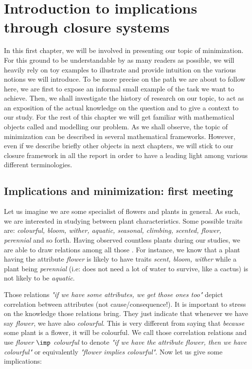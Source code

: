 \chapter{Introduction to implications through closure systems}

In this first chapter, we will be involved in presenting our topic of 
minimization. For this ground to be understandable by as many readers as 
possible, we will heavily rely on toy examples to illustrate and provide 
intuition on the various notions we will introduce. To be more precise on the
path we are about to follow here, we are first to expose an informal
small example of the task we want to achieve. Then, we shall investigate the
history of research on our topic, to act as an exposition of the actual 
knowledge on the question and to give a context to our study. For the rest of
this chapter we will get familiar with mathematical objects called 
 and  modelling our problem.
As we shall observe, the topic of minimization can be described in several 
mathematical frameworks. However, even if we describe briefly other objects
in next chapters, we will stick to our closure framework in all the report in
order to have a leading light among various different terminologies.

\section{Implications and minimization: first meeting}

Let us imagine we are some specialist of flowers and plants in general. As such,
we are interested in studying  between plant 
characteristics. Some possible traits are: \textit{colourful, bloom, wither, 
aquatic, seasonal, climbing, scented, flower, perennial} and so forth. Having
observed countless plants during our studies, we are able to draw relations
among all those . For instance, we know that a plant having
the attribute \textit{flower} is likely to have traits \textit{scent, bloom, 
wither} while a plant being \textit{perennial} (i.e: does not need a lot of
water to survive, like a cactus) is not likely to be \textit{aquatic}. 

\vspace{1.2em}

Those relations \textit{"if we have some attributes, we get those ones too"}
depict correlation between attributes (not cause/consequence!). It is important
to stress on the knowledge those relations bring. They just indicate that 
whenever we have say \textit{flower}, we have also \textit{colourful}. This is 
very different from saying that \textit{because} some plant is a flower, it 
will be colourful. We call those correlation relations 
and use \textit{flower $\imp$ colourful} to denote \textit{"if we have the attribute flower, then we have colourful"} or equivalently \textit{"flower implies colourful"}. Now let us give some implications:

